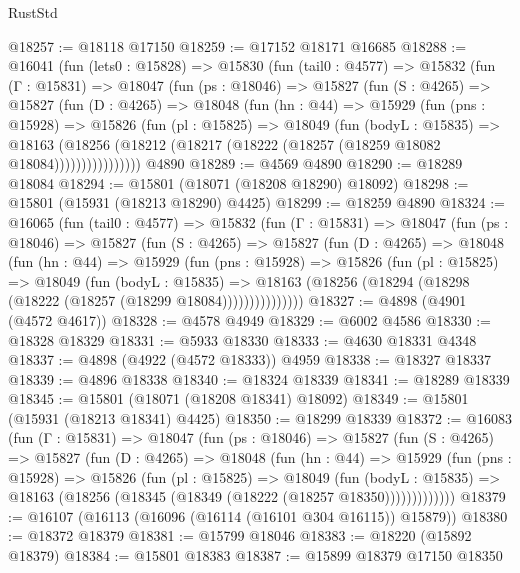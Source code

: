 \begin{lexlean}{RustStd}
\begin{coremodule}
@18257 := @18118 @17150
@18259 := @17152 @18171 @16685
@18288 := @16041
    (fun (lets0 : @15828) =>
    @15830
      (fun (tail0 : @4577) =>
      @15832
        (fun (Γ : @15831) =>
        @18047
          (fun (ps : @18046) =>
          @15827
            (fun (S : @4265) =>
            @15827
              (fun (D : @4265) =>
              @18048
                (fun (hn : @44) =>
                @15929
                  (fun (pns : @15928) =>
                  @15826
                    (fun (pl : @15825) =>
                    @18049
                      (fun (bodyL : @15835) =>
                      @18163
                        (@18256
                          (@18212 (@18217 (@18222 (@18257 (@18259 @18082 @18084))))))))))))))))
    @4890
@18289 := @4569 @4890
@18290 := @18289 @18084
@18294 := @15801 (@18071 (@18208 @18290) @18092)
@18298 := @15801 (@15931 (@18213 @18290) @4425)
@18299 := @18259 @4890
@18324 := @16065
    (fun (tail0 : @4577) =>
    @15832
      (fun (Γ : @15831) =>
      @18047
        (fun (ps : @18046) =>
        @15827
          (fun (S : @4265) =>
          @15827
            (fun (D : @4265) =>
            @18048
              (fun (hn : @44) =>
              @15929
                (fun (pns : @15928) =>
                @15826
                  (fun (pl : @15825) =>
                  @18049
                    (fun (bodyL : @15835) =>
                    @18163 (@18256 (@18294 (@18298 (@18222 (@18257 (@18299 @18084)))))))))))))))
@18327 := @4898 (@4901 (@4572 @4617))
@18328 := @4578 @4949
@18329 := @6002 @4586
@18330 := @18328 @18329
@18331 := @5933 @18330
@18333 := @4630 @18331 @4348
@18337 := @4898 (@4922 (@4572 @18333)) @4959
@18338 := @18327 @18337
@18339 := @4896 @18338
@18340 := @18324 @18339
@18341 := @18289 @18339
@18345 := @15801 (@18071 (@18208 @18341) @18092)
@18349 := @15801 (@15931 (@18213 @18341) @4425)
@18350 := @18299 @18339
@18372 := @16083
    (fun (Γ : @15831) =>
    @18047
      (fun (ps : @18046) =>
      @15827
        (fun (S : @4265) =>
        @15827
          (fun (D : @4265) =>
          @18048
            (fun (hn : @44) =>
            @15929
              (fun (pns : @15928) =>
              @15826
                (fun (pl : @15825) =>
                @18049
                  (fun (bodyL : @15835) =>
                  @18163 (@18256 (@18345 (@18349 (@18222 (@18257 @18350)))))))))))))
@18379 := @16107 (@16113 (@16096 (@16114 (@16101 @304 @16115)) @15879))
@18380 := @18372 @18379
@18381 := @15799 @18046
@18383 := @18220 (@15892 @18379)
@18384 := @15801 @18383
@18387 := @15899 @18379 @17150 @18350

\end{coremodule}
\end{lexlean}
